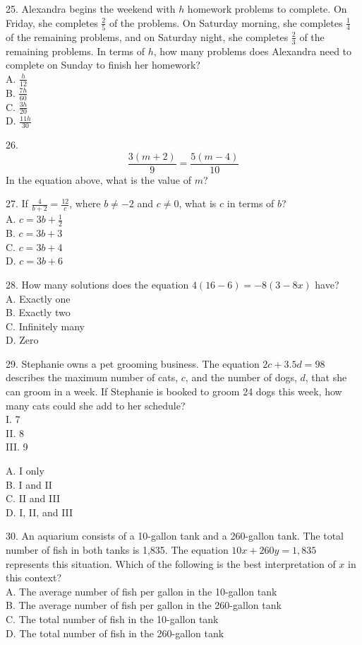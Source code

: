 \documentclass[../satmath.tex]{subfiles}
\begin{document}
25. Alexandra begins the weekend with $h$ homework problems to complete. On Friday, she completes $\frac{2}{5}$ of the problems. On Saturday morning,
she completes $\frac{1}{4}$ of the remaining problems, and on Saturday night, she completes $\frac{2}{3}$ of the remaining problems. In terms of $h$, 
how many problems does Alexandra need to complete on Sunday to finish her homework?\\
A. $\frac{h}{12}$\\
B. $\frac{7h}{60}$\\
C. $\frac{3h}{20}$\\
D. $\frac{11h}{30}$
\medbreak

26. 
\[\frac{3(m+2)}{9}=\frac{5(m-4)}{10}\]
In the equation above, what is the value of $m$?
\medbreak

27. If $\frac{4}{b+2}=\frac{12}{c}$, where $b\neq -2$ and $c\neq 0$, what is $c$ in terms of $b$?\\
A. $c=3b+\frac{1}{2}$\\
B. $c=3b+3$\\
C. $c=3b+4$\\
D. $c=3b+6$
\medbreak

28. How many solutions does the equation $4(16-6)=-8(3-8x)$ have?\\
A. Exactly one\\
B. Exactly two\\
C. Infinitely many\\
D. Zero
\medbreak

29. Stephanie owns a pet grooming business. The equation $2c+3.5d=98$ describes the maximum number of cats, $c$, and the number of dogs, $d$,
that she can groom in a week. If Stephanie is booked to groom 24 dogs this week, how many cats could she add to her schedule?\\
I. 7\\
II. 8\\
III. 9

A. I only\\
B. I and II\\
C. II and III\\
D. I, II, and III
\medbreak

30. An aquarium consists of a 10-gallon tank and a 260-gallon tank. The total number of fish in both tanks is 1,835. The equation $10x+260y=1,835$ 
represents this situation. Which of the following is the best interpretation of $x$ in this context?\\
A. The average number of fish per gallon in the 10-gallon tank\\
B. The average number of fish per gallon in the 260-gallon tank\\
C. The total number of fish in the 10-gallon tank\\
D. The total number of fish in the 260-gallon tank 
\medbreak
\end{document}
